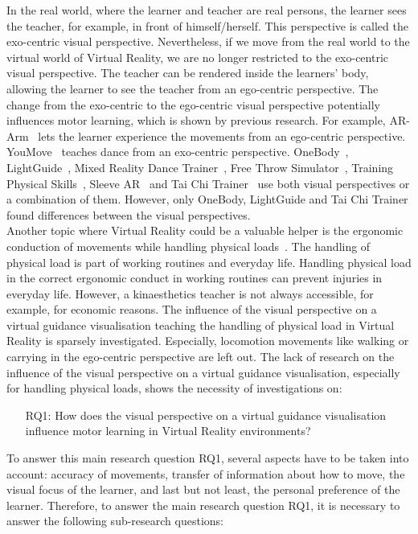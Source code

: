 In the real world, where the learner and teacher are real persons, the learner sees the teacher, for example, in front of himself/herself. This perspective is called the exo-centric visual perspective. Nevertheless, if we move from the real world to the virtual world of Virtual Reality, we are no longer restricted to the exo-centric visual perspective. The teacher can be rendered inside the learners' body, allowing the learner to see the teacher from an ego-centric perspective. The change from the exo-centric to the ego-centric visual perspective potentially influences motor learning, which is shown by previous research. For example, AR-Arm~\cite{ararm} lets the learner experience the movements from an ego-centric perspective. YouMove~\cite{YouMove} teaches dance from an exo-centric perspective. OneBody~\cite{onebody}, LightGuide~\cite{lightguide}, Mixed Reality Dance Trainer~\cite{mrdancetrainer}, Free Throw Simulator~\cite{freethrowsimulator}, Training Physical Skills~\cite{trainingphysicalskills}, Sleeve AR~\cite{sleevear} and Tai Chi Trainer~\cite{thaichichua} use both visual perspectives or a combination of them. However, only OneBody, LightGuide and Tai Chi Trainer found differences between the visual perspectives.\\
Another topic where Virtual Reality could be a valuable helper is the ergonomic conduction of movements while handling physical loads~\cite{nursecare,kitt}. The handling of physical load is part of working routines and everyday life. Handling physical load in the correct ergonomic conduct in working routines can prevent injuries in everyday life. However, a kinaesthetics teacher is not always accessible, for example, for economic reasons. The influence of the visual perspective on a virtual guidance visualisation teaching the handling of physical load in Virtual Reality is sparsely investigated. Especially, locomotion movements like walking or carrying in the ego-centric perspective are left out. The lack of research on the influence of the visual perspective on a virtual guidance visualisation, especially for handling physical loads, shows the necessity of investigations on:
\begin{itemize}
	\item[RQ1:] How does the visual perspective on a virtual guidance visualisation influence motor learning in Virtual Reality environments?
\end{itemize}
To answer this main research question RQ1, several aspects have to be taken into account: accuracy of movements, transfer of information about how to move, the visual focus of the learner, and last but not least, the personal preference of the learner. Therefore, to answer the main research question RQ1, it is necessary to answer the following sub-research questions:
